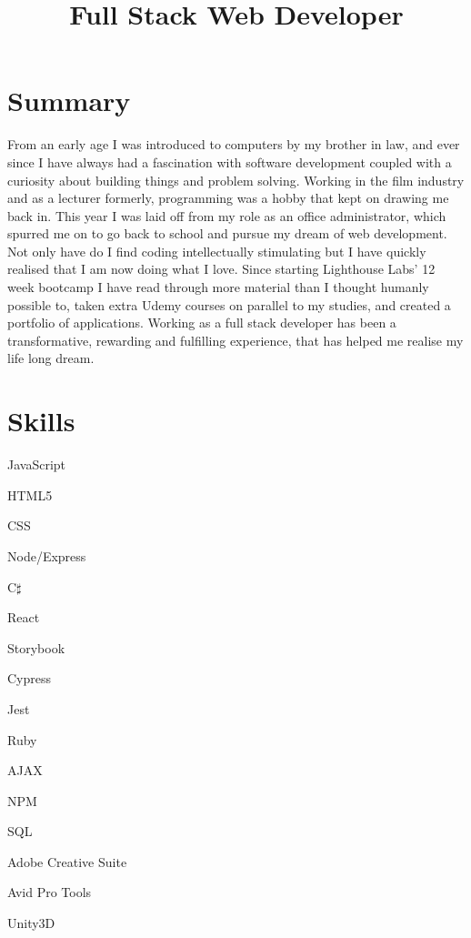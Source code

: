 \documentclass[11pt,a4paper, sans]{moderncv}
\title{Full Stack Web Developer}          %
\begin{document}
\makecvtitle

\section{Summary} %
\label{sec:summary}

From an early age I was introduced to computers by my brother in law, and ever since I have always had a fascination with software development coupled with a curiosity about building things and problem solving. Working in the film industry and as a lecturer formerly, programming was a hobby that kept on drawing me back in. This year I was laid off from my role as an office administrator, which spurred me on to go back to school and pursue my dream of web development. Not only have do I find coding intellectually stimulating but I have quickly realised that I am now doing what I love. Since starting Lighthouse Labs' 12 week bootcamp I have read through more material than I thought humanly possible to, taken extra Udemy courses on parallel to my studies, and created a portfolio of applications. Working as a full stack developer has been a transformative, rewarding and fulfilling experience, that has helped me realise my life long dream.


\section{Skills}
\begin{itemize}
  \begin{multicols}{3}
  \item JavaScript
  \item HTML5
  \item CSS
  \item Node/Express
  \item C$\sharp$ 
  \item React
  \item Storybook
  \item Cypress
  \item Jest
  \item Ruby
  \item AJAX
  \item NPM
  \item SQL
  \item Adobe Creative Suite
  \item Avid Pro Tools
  \item Unity3D
\end{multicols}
\end{itemize}
\end{document}
